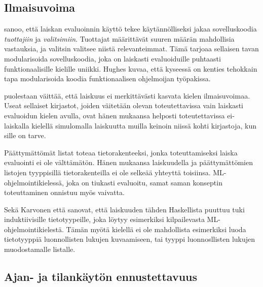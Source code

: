 \subsection{Ilmaisuvoima}
\citet{hughes1989functional} sanoo, että laiskan evaluoinnin käyttö tekee käytännölliseksi jakaa sovelluskoodia \textit{tuottajiin} ja \textit{valitsimiin}. Tuottajat määrittävät suuren määrän mahdollisia vastauksia, ja valitsin valitsee niistä relevanteimmat. Tämä tarjoaa sellaisen tavan modularisoida sovelluskoodia, joka on laiskasti evaluoiduille puhtaasti funktionaalisille kielille uniikki. Hughes kuvaa, että kyseessä on kenties tehokkain tapa modularisoida koodia funktionaalisen ohjelmoijan työpakissa.

\citet{vesakarvonen} puolestaan väittää, että laiskuus ei merkittävästi kasvata kielen ilmaisuvoimaa. Useat sellaiset kirjastot, joiden väitetään olevan toteutettavissa vain laiskasti evaluoidun kielen avulla, ovat hänen mukaansa helposti toteutettavissa ei-laiskalla kielellä simulomalla laiskuutta muilla keinoin niissä kohti kirjastoja, kun sille on tarve.

Päättymättömät listat \citet{pointoflaziness} toteaa tietorakenteeksi, jonka toteuttamiseksi laiska evaluointi ei ole välttämätön. Hänen mukaansa laiskuudella ja päättymättömien listojen tyyppisillä tietorakenteilla ei ole selkeää yhteyttä toisiinsa. ML-ohjelmointikielessä, joka on tiukasti evaluoitu, samat saman konseptin toteuttaminen onnistuu myös vaivatta.

Sekä Karvonen että \citet{pointoflaziness} sanovat, että laiskuuden tähden Haskellista puuttuu tuki induktiivisille tietotyypeille, joka löytyy esimerkiksi kilpailevasta ML-ohjelmointikielestä. Tämän myötä kielellä ei ole mahdollista esimerkiksi luoda tietotyyppiä luonnollisten lukujen kuvaamiseen, tai tyyppi luonnosllisten lukujen muodostamalle listalle.

\subsection{Ajan- ja tilankäytön ennustettavuus}

